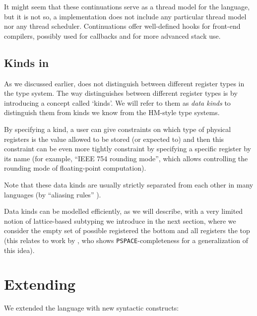 It might seem that these continuations serve as a thread model for the language, but it is not so, a \cmm implementation does not include any particular thread model nor any thread scheduler. Continuations offer well-defined hooks for front-end compilers, possibly used for callbacks and for more advanced stack use. \cite{ramsey2005c}

\subsection{Kinds in \cmm}

As we discussed earlier, \cmm does not distinguish between different register types in the type system. The way \cmm distinguishes between different register types is by introducing a concept called `kinds'. We will refer to them as \emph{data kinds} to distinguish them from kinds we know from the HM-style type systems.

By specifying a kind, a user can give constraints on which type of physical registers is the value allowed to be stored (or expected to) and then this constraint can be even more tightly constraint by specifying a specific register by its name (for example, ``IEEE 754 rounding mode'', which allows controlling the rounding mode of floating-point computation).

Note that these data kinds are usually strictly separated from each other in many languages (by ``aliasing rules'' \cite{cstandard2018}).

Data kinds can be modelled efficiently, as we will describe, with a very limited notion of lattice-based subtyping we introduce in the next section, where we consider the empty set of possible registered the bottom and all registers the top (this relates to work by \citet{tiuryn1999subtyping}, who shows \texttt{PSPACE}-completeness for a generalization of this idea).

\section{Extending \cmm}
\label{sec:extension}

We extended the language with new syntactic constructs:


